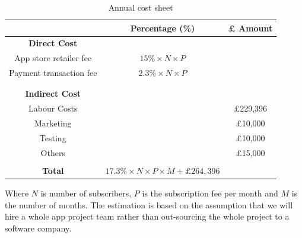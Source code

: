 \begin{table}[ht]
\centering
\begin{tabular}{ |c|c|c|} 
 \hline
 &\textbf{Percentage (\%)} &\textbf{ £ Amount }\\
 \hline
\multicolumn{1}{|c}{\textbf{Direct Cost}} &\multicolumn{1}{c}{}&\\
 \hline
 App store retailer fee&$15\%\times N \times P$&\\
 \hline
 Payment transaction fee&$2.3\% \times N \times P$&\\
 \hline
 &&\\
 \hline
 \multicolumn{1}{|c}{}&\multicolumn{1}{c}{}&\\\hline
 \multicolumn{1}{|c}{\textbf{Indirect Cost}} &\multicolumn{1}{c}{}&\\
 \hline
 Labour Costs&&£229,396\\
 \hline
 Marketing&&£10,000\\
 \hline
 Testing&&£10,000\\
 \hline
 Others&&£15,000\\
 \hline
 \multicolumn{1}{|c}{}&\multicolumn{1}{c}{}&\\
 \hline
 \textbf{Total}&\multicolumn{1}{c}{$17.3\%\times N \times P \times M + \pounds 264,396$}&\\
 \hline
 \end{tabular}
 \caption{Annual cost sheet}
 \label{costsheet}
 \end{table}
Where $N$ is number of subscribers, $P$ is the subscription fee per month and $M$ is the number of months. The estimation is based on the assumption that we will hire a whole app project team rather than out-sourcing the whole project to a software company.

